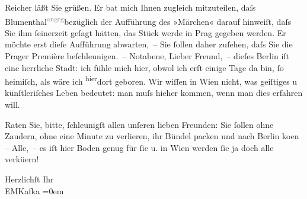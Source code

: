 \pstart
           Reicher läßt Sie grüßen. Er bat mich Ihnen
                  \introOben{}zugleich\introOben{} mitzuteilen, daſs Blumenthal\substVorne{}\textsuperscript{\textcolor{gray}{angeg}}\substDazwischen{}bezüglich\substHinten{} der Aufführung des »Märchen« darauf {\pb}hinweiſt, daſs Sie ihm{ }ſeinerzeit geſagt hätten, das
               Stück werde in Prag gegeben werden. Er möchte erst dieſe
               Aufführung abwarten, – Sie{ }ſollen daher zuſehen, daſs Sie die Prager Première beſchleunigen. – Notabene, Lieber Freund, –
               dieſes Berlin iſt eine herrliche Stadt: ich fühle
               mich hier, obwol ich erſt einige Tage da bin,{ }ſo heimiſch, als wäre {\pb}ich \substVorne{}\textsuperscript{hier}\substDazwischen{}dort\substHinten{} geboren. Wir wiſſen in Wien nicht, was
               geiſtiges u künſtleriſches Leben bedeutet: man muſs hieher kommen, wenn man dies
               erfahren will.\pend
           
\pstart
           Raten Sie, bitte,{ }ſchleunigſt allen unſeren lieben Freunden: Sie{ }ſollen ohne Zaudern,
               ohne eine Minute zu verlieren, ihr Bündel packen und nach Berlin ko{\geminationm}en – Alle, – es iſt hier
               Boden genug für{ }ſie u. in Wien werden{ }ſie \introOben{}ja\introOben{} doch alle verkü{\geminationm}ern!\pend
           
\pstart
           Herzlichſt Ihr{\\[\baselineskip]}\spacefill\mbox{EMKafka}\pend
           \leftskip=0em{}
\pstart
           \noindent{}\label{T_L00158-1v}\label{T_L00158-1}\pend
           \endnumbering{}  \newcommand{\dateiname}{L00158}\newcommand{\titel}{Eduard Michael Kafka an Arthur Schnitzler, 12. 1. 1893}\newcommand{\editorInnen}{Martin Anton Müller und Gerd-Hermann Susen}
